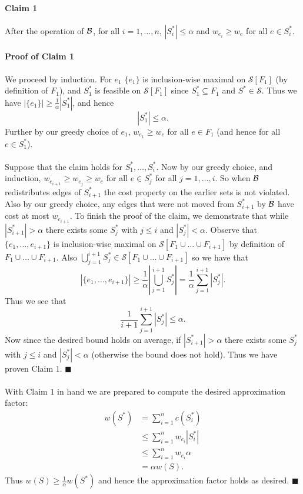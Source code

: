 \documentclass[letterpaper,12pt,oneside,onecolumn]{article}
\newcommand{\cS}{\mathcal{S}} \newcommand{\cT}{\mathcal{T}}
\begin{document}
\paragraph{Claim 1}
After the operation of $\mathcal{B}$, for all $i = 1, \dots, n$, $|S^*_i| \leq \alpha$ and $w_{e_i} \geq w_e$ for all $e \in S^*_i$.
\paragraph{Proof of Claim 1}
We proceed by induction. For $e_1$ $\{e_1\}$ is inclusion-wise maximal on $\cS[F_1]$ (by definition of $F_1$), and $S_1^*$ is feasible on $\cS[F_1]$ since $S^*_1 \subseteq F_1$ and $S^* \in \cS$. Thus we have $|\{e_1\}| \geq \frac{1}{\alpha} |S_1^*|$, and hence
$$|S^*_1| \leq \alpha.$$
Further by our greedy choice of $e_1$, $w_{e_1} \geq w_e$ for all $e \in F_1$ (and hence for all $e \in S^*_1$).
\paragraph{}
Suppose that the claim holds for $S^*_1 ,\dots, S^*_i$. Now by our greedy choice, and induction, $w_{e_{i+1}} \geq w_{e_j} \geq w_e$ for all $e \in S^*_j$ for all $j = 1,\dots, i$. So when $\mathcal{B}$ redistributes edges of $S^*_{i+1}$ the cost property on the earlier sets is not violated. Also by our greedy choice, any edges that were not moved from $S^*_{i+1}$ by $\mathcal{B}$ have cost at most $w_{e_{i+1}}$. To finish the proof of the claim, we demonstrate that while $|S_{i+1}^*| > \alpha$ there exists some $S^*_j$ with $j\leq i$ and $|S^*_j| < \alpha$. Observe that $\{e_1, \dots, e_{i+1}\}$ is inclusion-wise maximal on $\cS[F_1 \cup \dots \cup F_{i+1}]$ by definition of $F_1 \cup \dots \cup F_{i+1}$. Also $\bigcup_{j=1}^{i+1} S^*_j \in \cS[F_1 \cup \dots \cup F_{i+1}]$ so we have that
$$|\{e_1, \dots, e_{i+1}\}| \geq \frac{1}{\alpha} |\bigcup_{j=1}^{i+1} S^*_j | = \frac{1}{\alpha} \sum_{j=1}^{i+1} |S^*_j|.$$
Thus we see that
$$ \frac{1}{i+1}\sum_{j=1}^{i+1} |S^*_j| \leq \alpha.$$
Now since the desired bound holds on average, if $|S^*_{i+1}| > \alpha$ there exists some $S^*_j$ with $j \leq i$ and $|S^*_j| < \alpha$ (otherwise the bound does not hold). Thus we have proven Claim $1$. $\blacksquare$
\paragraph{}
With Claim $1$ in hand we are prepared to compute the desired approximation factor:
\begin{align*}
w(S^*) &= \sum_{i=1}^n c(S^*_i) \\
&\leq \sum_{i=1}^n w_{e_i} |S^*_i| \\
&\leq \sum_{i=1}^n w_{e_i} \alpha \\
&= \alpha w(S).
\end{align*}
Thus $w(S) \geq \frac{1}{\alpha} w(S^*)$ and hence the approximation factor holds as desired. $\blacksquare$
\end{document}
